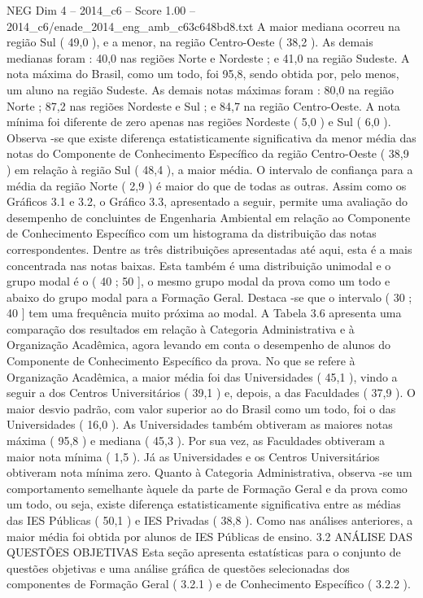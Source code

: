 \begin{textsample}{NEG Dim 4 – 2014\_c6 – Score 1.00 – 2014\_c6/enade\_2014\_eng\_amb\_c63c648bd8.txt}
A maior mediana ocorreu na região Sul ( 49,0 ), e a menor, na região Centro-Oeste ( 38,2 ).
As demais medianas foram : 40,0 nas regiões Norte e Nordeste ; e 41,0 na região Sudeste.
A nota máxima do Brasil, como um todo, foi 95,8, sendo obtida por, pelo menos, um aluno na região Sudeste.
As demais notas máximas foram : 80,0 na região Norte ; 87,2 nas regiões Nordeste e Sul ; e 84,7 na região Centro-Oeste.
A nota mínima foi diferente de zero apenas nas regiões Nordeste ( 5,0 ) e Sul ( 6,0 ).
Observa -se que existe diferença estatisticamente significativa da menor média das notas do Componente de Conhecimento Específico da região Centro-Oeste ( 38,9 ) em relação à região Sul ( 48,4 ), a maior média.
O intervalo de confiança para a média da região Norte ( 2,9 ) é maior do que de todas as outras.
Assim como os Gráficos 3.1 e 3.2, o Gráfico 3.3, apresentado a seguir, permite uma avaliação do desempenho de concluintes de Engenharia Ambiental em relação ao Componente de Conhecimento Específico com um histograma da distribuição das notas correspondentes.
Dentre as três distribuições apresentadas até aqui, esta é a mais concentrada nas notas baixas.
Esta também é uma distribuição unimodal e o grupo modal é o ( 40 ; 50 ], o mesmo grupo modal da prova como um todo e abaixo do grupo modal para a Formação Geral.
Destaca -se que o intervalo ( 30 ; 40 ] tem uma frequência muito próxima ao modal.
A Tabela 3.6 apresenta uma comparação dos resultados em relação à Categoria Administrativa e à Organização Acadêmica, agora levando em conta o desempenho de alunos do Componente de Conhecimento Específico da prova.
No que se refere à Organização Acadêmica, a maior média foi das Universidades ( 45,1 ), vindo a seguir a dos Centros Universitários ( 39,1 ) e, depois, a das Faculdades ( 37,9 ).
O maior desvio padrão, com valor superior ao do Brasil como um todo, foi o das Universidades ( 16,0 ).
As Universidades também obtiveram as maiores notas máxima ( 95,8 ) e mediana ( 45,3 ).
Por sua vez, as Faculdades obtiveram a maior nota mínima ( 1,5 ).
Já as Universidades e os Centros Universitários obtiveram nota mínima zero.
Quanto à Categoria Administrativa, observa -se um comportamento semelhante àquele da parte de Formação Geral e da prova como um todo, ou seja, existe diferença estatisticamente significativa entre as médias das IES Públicas ( 50,1 ) e IES Privadas ( 38,8 ).
Como nas análises anteriores, a maior média foi obtida por alunos de IES Públicas de ensino. 3.2 ANÁLISE DAS QUESTÕES OBJETIVAS Esta seção apresenta estatísticas para o conjunto de questões objetivas e uma análise gráfica de questões selecionadas dos componentes de Formação Geral ( 3.2.1 ) e de Conhecimento Específico ( 3.2.2 ).

\end{textsample}
